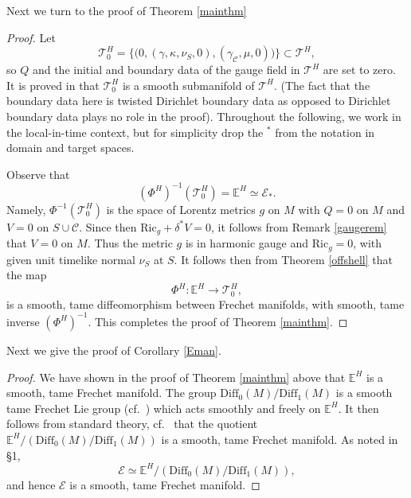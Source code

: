 \documentclass[10pt]{amsart}
\newcommand{\g}{\gamma}
\renewcommand{\d}{\delta}
\renewcommand{\k}{\kappa}
\newcommand{\cC}{{\mathcal C}}
\newcommand{\cT}{{\mathcal T}}
\newcommand{\cE}{{\mathcal E}}
\newcommand{\bE}{\mathbb E}
\newcommand{\Diff}{\mathrm{Diff}}
\newcommand{\Ric}{\mathrm{Ric}}
\renewcommand{\to}{\rightarrow}
\newcommand{\<}{\langle}
\renewcommand{\>}{\rangle}
\theoremstyle{plain}
\theoremstyle{remark}
\theoremstyle{definition}
\numberwithin{equation}{section}
\begin{document}
Next we turn to the proof of Theorem \ref{mainthm}

\begin{proof}
Let 
$$\cT^H_0 = \{ \big(0, (\g, \k, \nu_S, 0), (\g_{\cC}, \mu, 0)\big) \} \subset \cT^H,$$
so $Q$ and the initial and boundary data of the gauge field in $\cT^H$ are set to zero. It is proved in \cite{I} that $\cT^H_0$ is a smooth submanifold 
of $\cT^H$. (The fact that the boundary data here is twisted Dirichlet boundary data as opposed to Dirichlet boundary data plays no role in the proof). 
Throughout the following, we work in the local-in-time context, but for simplicity drop the $^*$ from the notation in domain and target spaces. 

  Observe that 
$$(\Phi^H)^{-1}(\cT^H_0) = \bE^H \simeq \cE_*.$$
Namely, $\Phi^{-1}(\cT^H_0)$ is the space of Lorentz metrics $g$ on $M$ with $Q  = 0$ on $M$ and $V = 0$ on $S \cup \cC$. Since then 
$\Ric_g + \d^*V = 0$, it follows from Remark \ref{gaugerem} that $V = 0$ on $M$. Thus the metric $g$ is in harmonic gauge and $\Ric_g = 0$, 
with given unit timelike normal $\nu_S$ at $S$. 
It follows then from Theorem \ref{offshell} that the map 
$$\Phi^H: \bE^H \to \cT^H_0,$$
is a smooth, tame diffeomorphism between Frechet manifolds, with smooth, tame inverse $(\Phi^H)^{-1}$. This completes the proof of Theorem \ref{mainthm}. 

\end{proof} 

Next we give the proof of Corollary \ref{Eman}. 

\begin{proof}
We have shown in the proof of Theorem \ref{mainthm} above that $\bE^H$ is a smooth, tame Frechet manifold. The group $\Diff_0(M)/\Diff_1(M)$ is a 
smooth tame Frechet Lie group (cf.~\cite[I.4.6]{Ham}) which acts smoothly and freely on $\bE^H$. It then  follows from standard theory, 
cf.~\cite[Cor.III.2.5.2]{Ham} that the quotient $\bE^H / (\Diff_0(M)/\Diff_1(M))$ is a smooth, tame Frechet manifold. As noted in \S 1, 
$$\cE \simeq \bE^H / (\Diff_0(M)/\Diff_1(M)),$$
and hence $\cE$ is a smooth, tame Frechet manifold. 

\end{proof}
\end{document}
